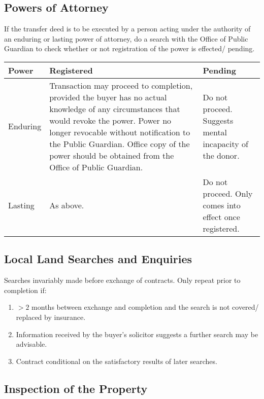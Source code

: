 \documentclass[
]{article}
\providecommand{\tightlist}{%
  \setlength{\itemsep}{0pt}\setlength{\parskip}{0pt}}
\begin{document}
\hypertarget{powers-of-attorney}{%
\subsection{Powers of Attorney}\label{powers-of-attorney}}

If the transfer deed is to be executed by a person acting under the
authority of an enduring or lasting power of attorney, do a search with
the Office of Public Guardian to check whether or not registration of
the power is effected/ pending.

\begin{longtable}[]{@{}lll@{}}
\toprule()
Power & Registered & Pending \\
\midrule()
\endhead
Enduring & Transaction may proceed to completion, provided the buyer has
no actual knowledge of any circumstances that would revoke the power.
Power no longer revocable without notification to the Public Guardian.
Office copy of the power should be obtained from the Office of Public
Guardian. & Do not proceed. Suggests mental incapacity of the donor. \\
Lasting & As above. & Do not proceed. Only comes into effect once
registered. \\
\bottomrule()
\end{longtable}

\hypertarget{local-land-searches-and-enquiries}{%
\subsection{Local Land Searches and
Enquiries}\label{local-land-searches-and-enquiries}}

Searches invariably made before exchange of contracts. Only repeat prior
to completion if:

\begin{enumerate}
\tightlist
\item
  {\(> 2\)} months between exchange and completion and the search is not
  covered/ replaced by insurance.
\item
  Information received by the buyer's solicitor suggests a further
  search may be advisable.
\item
  Contract conditional on the satisfactory results of later searches.
\end{enumerate}

\hypertarget{inspection-of-the-property}{%
\subsection{Inspection of the
Property}\label{inspection-of-the-property}}
\end{document}
